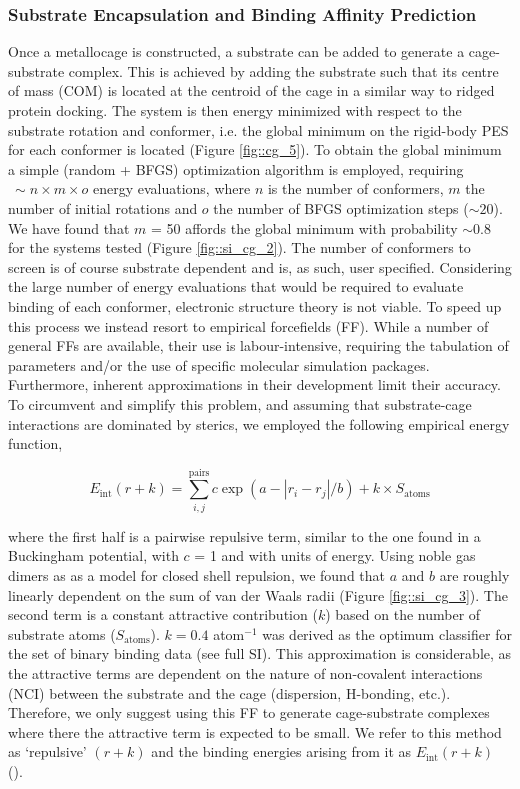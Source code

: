\documentclass[../../main.tex]{subfiles}
\begin{document}
\subsubsection{Substrate Encapsulation and Binding Affinity Prediction}
 Once a metallocage is constructed, a substrate can be added to generate a cage-substrate complex. This is achieved by adding the substrate such that its centre of mass (COM) is located at the centroid of the cage in a similar way to ridged protein docking. The system is then energy minimized with respect to the substrate rotation and conformer, i.e. the global minimum on the rigid-body PES for each conformer is located (Figure \ref{fig::cg_5}). To obtain the global minimum a simple (random + BFGS) optimization algorithm is employed,\cite{SciPy} requiring $~\sim n\times m\times o$ energy evaluations, where $n$ is the number of conformers, $m$ the number of initial rotations and $o$ the number of BFGS optimization steps ($\sim20$). We have found that $m$ = 50 affords the global minimum with probability $\sim0.8$ for the systems tested (Figure \ref{fig::si_cg_2}). The number of conformers to screen is of course substrate dependent and is, as such, user specified.
Considering the large number of energy evaluations that would be required to evaluate binding of each conformer, electronic structure theory is not viable. To speed up this process we instead resort to empirical forcefields (FF). While a number of general FFs are available, their use is labour-intensive, requiring the tabulation of parameters and/or the use of specific molecular simulation packages. Furthermore, inherent approximations in their development limit their accuracy. To circumvent and simplify this problem, and assuming that substrate-cage interactions are dominated by sterics, we employed the following empirical energy function,

\begin{equation}
	E_\text{int}(r+k) = \sum_{i,j}^\text{pairs}  c \exp(a - |r_i - r_j|/b) +  k \times S_\text{atoms}	
\end{equation}

where the first half is a pairwise repulsive term, similar to the one found in a Buckingham potential, with $c$ = 1 and with units of energy. Using noble gas dimers as as a model for closed shell repulsion, we found that $a$ and $b$ are roughly linearly dependent on the sum of van der Waals radii (Figure \ref{fig::si_cg_3}). The second term is a constant attractive contribution ($k$) based on the number of substrate atoms ($S_\text{atoms}$). $k = 0.4$ \kcalx atom$^{-1}$ was derived as the optimum classifier for the set of binary binding data (see full SI). This approximation is considerable, as the attractive terms are dependent on the nature of non-covalent interactions (NCI) between the substrate and the cage (dispersion, H-bonding, etc.). Therefore, we only suggest using this FF to generate cage-substrate complexes where there the attractive term is expected to be small. We refer to this method as ‘repulsive’ $(r+k)$ and the binding energies arising from it as $E_\text{int}(r+k)$ ().
\end{document}
